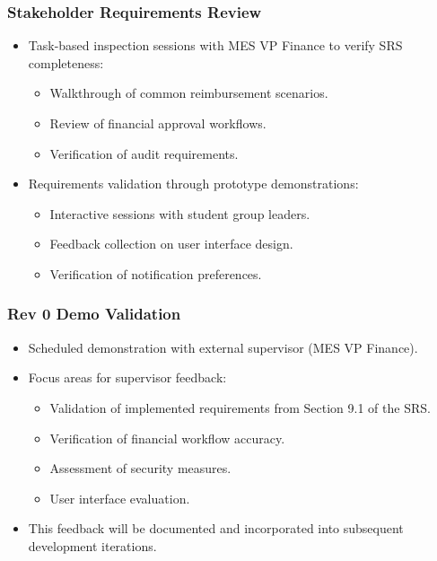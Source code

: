 \documentclass[12pt, titlepage]{article}
\begin{document}
\subsubsection*{Stakeholder Requirements Review}
\begin{itemize}
   \item Task-based inspection sessions with MES VP Finance to verify SRS completeness:
   \begin{itemize}
       \item Walkthrough of common reimbursement scenarios.
       \item Review of financial approval workflows.
       \item Verification of audit requirements.
   \end{itemize}
   \item Requirements validation through prototype demonstrations:
   \begin{itemize}
       \item Interactive sessions with student group leaders.
       \item Feedback collection on user interface design.
       \item Verification of notification preferences.
   \end{itemize}
\end{itemize}

\subsubsection*{Rev 0 Demo Validation}
\begin{itemize}
   \item Scheduled demonstration with external supervisor (MES VP Finance).
   \item Focus areas for supervisor feedback:
   \begin{itemize}
       \item Validation of implemented requirements from Section 9.1 of the SRS.
       \item Verification of financial workflow accuracy.
       \item Assessment of security measures.
       \item User interface evaluation.
   \end{itemize}
   \item This feedback will be documented and incorporated into subsequent development iterations.
\end{itemize}
\end{document}
